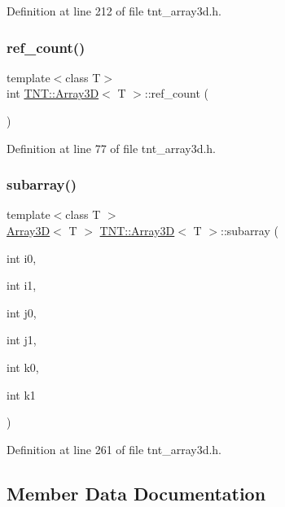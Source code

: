 Definition at line 212 of file tnt\+\_\+array3d.\+h.

\mbox{\label{classTNT_1_1Array3D_a50bbefb0aa842c2d7208b67fb09bb0d9}} 
\subsubsection{\texorpdfstring{ref\+\_\+count()}{ref\_count()}}
{\footnotesize\ttfamily template$<$class T$>$ \\
int \hyperlink{classTNT_1_1Array3D}{T\+N\+T\+::\+Array3D}$<$ T $>$\+::ref\+\_\+count (\begin{DoxyParamCaption}{ }\end{DoxyParamCaption})\hspace{0.3cm}{\ttfamily [inline]}}



Definition at line 77 of file tnt\+\_\+array3d.\+h.

\mbox{\label{classTNT_1_1Array3D_a365b3f6c5eb41e5189b20b25d80aee98}} 
\subsubsection{\texorpdfstring{subarray()}{subarray()}}
{\footnotesize\ttfamily template$<$class T $>$ \\
\hyperlink{classTNT_1_1Array3D}{Array3D}$<$ T $>$ \hyperlink{classTNT_1_1Array3D}{T\+N\+T\+::\+Array3D}$<$ T $>$\+::subarray (\begin{DoxyParamCaption}\item[{int}]{i0,  }\item[{int}]{i1,  }\item[{int}]{j0,  }\item[{int}]{j1,  }\item[{int}]{k0,  }\item[{int}]{k1 }\end{DoxyParamCaption})}



Definition at line 261 of file tnt\+\_\+array3d.\+h.



\subsection{Member Data Documentation}
\mbox{\label{classTNT_1_1Array3D_aefb5480851ab24e2fcbf27b5597f8b1b}} 
